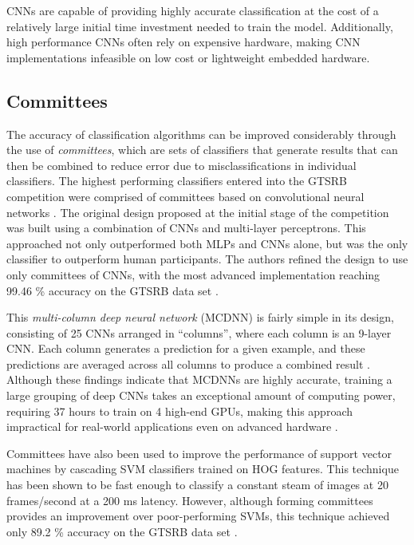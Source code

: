 \documentclass[letterpaper,twocolumn,10pt]{article}
\begin{document}
CNNs are capable of providing highly accurate classification at the cost of a relatively large initial time investment needed to train the model. Additionally, high performance CNNs often rely on expensive hardware, making CNN implementations infeasible on low cost or lightweight embedded hardware.

\subsection{Committees}

The accuracy of classification algorithms can be improved considerably through the use of \emph{committees}, which are sets of classifiers that generate results that can then be combined to reduce error due to misclassifications in individual classifiers. The highest performing classifiers entered into the GTSRB competition were comprised of committees based on convolutional neural networks \cite{ciresan_committee_2011, ciresan_multi-column_2012, stallkamp_german_2011, stallkamp_man_2012}. The original design proposed at the initial stage of the competition was built using a combination of CNNs and multi-layer perceptrons. This approached not only outperformed both MLPs and CNNs alone, but was the only classifier to outperform human participants. The authors refined the design to use only committees of CNNs, with the most advanced implementation reaching 99.46 \% accuracy on the GTSRB data set \cite{ciresan_committee_2011, ciresan_multi-column_2012}.

This \emph{multi-column deep neural network} (MCDNN) is fairly simple in its design, consisting of 25 CNNs arranged in ``columns'', where each column is an 9-layer CNN. Each column generates a prediction for a given example, and these predictions are averaged across all columns to produce a combined result \cite{ciresan_multi-column_2012}. Although these findings indicate that MCDNNs are highly accurate, training a large grouping of deep CNNs takes an exceptional amount of computing power, requiring 37 hours to train on 4 high-end GPUs, making this approach impractical for real-world applications even on advanced hardware \cite{ciresan_multi-column_2012}.

Committees have also been used to improve the performance of support vector machines by cascading SVM classifiers trained on HOG features. This technique has been shown to be fast enough to classify a constant steam of images at 20 frames/second at a 200 ms latency. However, although forming committees provides an improvement over poor-performing SVMs, this technique achieved only 89.2 \% accuracy on the GTSRB data set \cite{greenhalgh_real-time_2012}.
\end{document}
